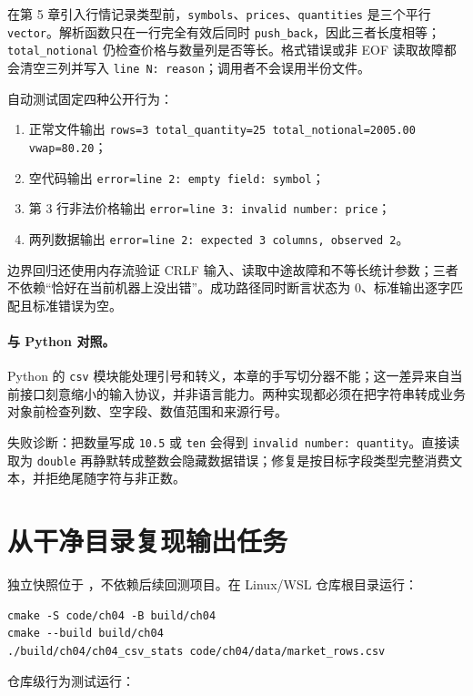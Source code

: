 在第 5 章引入行情记录类型前，\texttt{symbols}、\texttt{prices}、\texttt{quantities} 是三个平行 \texttt{vector}。解析函数只在一行完全有效后同时 \texttt{push\_back}，因此三者长度相等；\texttt{total\_notional} 仍检查价格与数量列是否等长。格式错误或非 EOF 读取故障都会清空三列并写入 \texttt{line N: reason}；调用者不会误用半份文件。

自动测试固定四种公开行为：

\begin{enumerate}
  \item 正常文件输出 \texttt{rows=3 total\_quantity=25 total\_notional=2005.00 vwap=80.20}；
  \item 空代码输出 \texttt{error=line 2: empty field: symbol}；
  \item 第 3 行非法价格输出 \texttt{error=line 3: invalid number: price}；
  \item 两列数据输出 \texttt{error=line 2: expected 3 columns, observed 2}。
\end{enumerate}

边界回归还使用内存流验证 CRLF 输入、读取中途故障和不等长统计参数；三者不依赖“恰好在当前机器上没出错”。成功路径同时断言状态为 0、标准输出逐字匹配且标准错误为空。

\paragraph{与 Python 对照。}
Python 的 \texttt{csv} 模块能处理引号和转义，本章的手写切分器不能；这一差异来自当前接口刻意缩小的输入协议，并非语言能力。两种实现都必须在把字符串转成业务对象前检查列数、空字段、数值范围和来源行号。

失败诊断：把数量写成 \texttt{10.5} 或 \texttt{ten} 会得到 \texttt{invalid number: quantity}。直接读取为 \texttt{double} 再静默转成整数会隐藏数据错误；修复是按目标字段类型完整消费文本，并拒绝尾随字符与非正数。

\section{从干净目录复现输出任务}

独立快照位于 ，不依赖后续回测项目。在 Linux/WSL 仓库根目录运行：

\begin{lstlisting}
cmake -S code/ch04 -B build/ch04
cmake --build build/ch04
./build/ch04/ch04_csv_stats code/ch04/data/market_rows.csv
\end{lstlisting}

仓库级行为测试运行：

